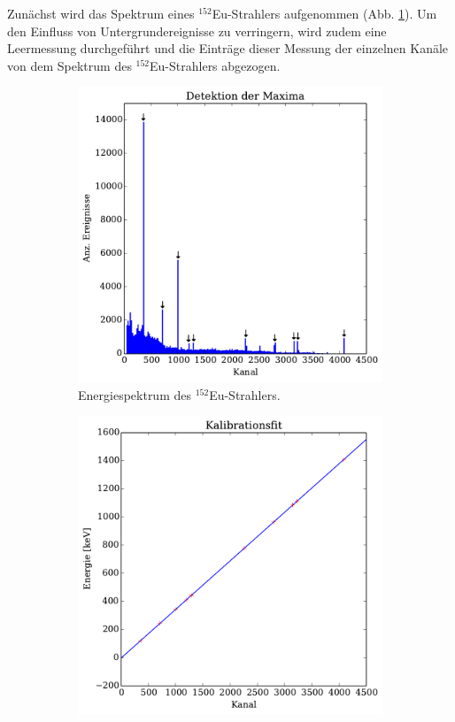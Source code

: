 Zunächst wird das Spektrum eines $^{152}$Eu-Strahlers aufgenommen (Abb.
\ref{fig:eu_uncalibrated}).
Um den Einfluss von Untergrundereignisse zu verringern, wird zudem eine
Leermessung durchgeführt und die Einträge dieser Messung der einzelnen Kanäle
von dem Spektrum des $^{152}$Eu-Strahlers abgezogen.
\begin{figure}[htb]
    \centering
    \begin{subfigure}{.49\linewidth}
        \includegraphics[width=1.0\linewidth]{img/02_maxima.pdf}
        \caption{
            Energiespektrum des $^{152}$Eu-Strahlers.
        }
        \label{fig:eu_uncalibrated}
    \end{subfigure}%
    \begin{subfigure}{.49\linewidth}
        \includegraphics[width=1.0\linewidth]{img/03_calibration.pdf}

\end{subfigure}
\end{figure}
